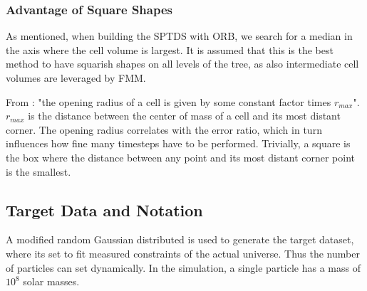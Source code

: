 \documentclass[]{article}
\begin{document}

\subsubsection{Advantage of Square Shapes}

As mentioned, when building the SPTDS with ORB, we search for a median in the axis where the cell volume is largest. It is assumed that this is the best method to have squarish shapes on all levels of the tree, as also intermediate cell volumes are leveraged by FMM. 

From \cite{Stadel2001}: "the opening radius of a cell is given by some constant factor times $r_{max}$". $r_{max}$ is the distance between the center of mass of a cell and its most distant corner. The opening radius correlates with the error ratio, which in turn influences how fine many timesteps have to be performed. Trivially, a square is the box where the distance between any point and its most distant corner point is the smallest. 


\subsection{Target Data and Notation}\label{sec:target-data}

\begin{comment}
The target data consists of $N$ particles where we use the following notations:

constrained realization
Gaussian random distribution, modified to match the measured power.

The higher the resolution the more accurate the result.

Large scales are more uniform, small scale 

smallest thing you want to be able to resolve. 

boxes around a giga parsec

want to be able to resolve galaxies, milky way 10^12 solar masses,

want to be able to resolve smaller galaxies, 10^8 for a single particle
Imp 
\end{comment}
A modified random Gaussian distributed is used to generate the target dataset, where its set to fit measured constraints of the actual universe. Thus the number of particles can set dynamically. In the simulation, a single particle has a mass of $10^8$ solar masses. 
\end{document}
